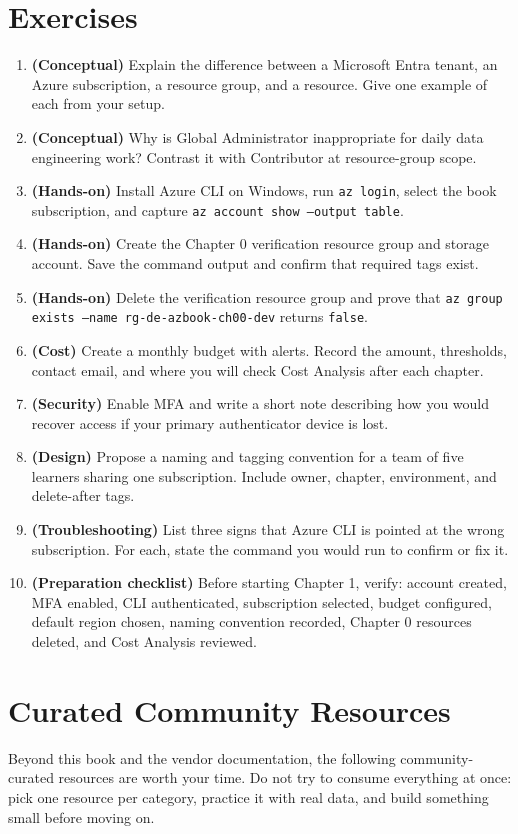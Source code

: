 \section{Exercises}
\begin{enumerate}
    \item \textbf{(Conceptual)} Explain the difference between a Microsoft Entra tenant, an Azure subscription, a resource group, and a resource. Give one example of each from your setup.
    \item \textbf{(Conceptual)} Why is Global Administrator inappropriate for daily data engineering work? Contrast it with Contributor at resource-group scope.
    \item \textbf{(Hands-on)} Install Azure CLI on Windows, run \texttt{az login}, select the book subscription, and capture \texttt{az account show --output table}.
    \item \textbf{(Hands-on)} Create the Chapter 0 verification resource group and storage account. Save the command output and confirm that required tags exist.
    \item \textbf{(Hands-on)} Delete the verification resource group and prove that \texttt{az group exists --name rg-de-azbook-ch00-dev} returns \texttt{false}.
    \item \textbf{(Cost)} Create a monthly budget with alerts. Record the amount, thresholds, contact email, and where you will check Cost Analysis after each chapter.
    \item \textbf{(Security)} Enable MFA and write a short note describing how you would recover access if your primary authenticator device is lost.
    \item \textbf{(Design)} Propose a naming and tagging convention for a team of five learners sharing one subscription. Include owner, chapter, environment, and delete-after tags.
    \item \textbf{(Troubleshooting)} List three signs that Azure CLI is pointed at the wrong subscription. For each, state the command you would run to confirm or fix it.
    \item \textbf{(Preparation checklist)} Before starting Chapter 1, verify: account created, MFA enabled, CLI authenticated, subscription selected, budget configured, default region chosen, naming convention recorded, Chapter 0 resources deleted, and Cost Analysis reviewed.
\end{enumerate}

\section{Curated Community Resources}
%
Beyond this book and the vendor documentation, the following community-curated resources are worth your time. Do not try to consume everything at once: pick one resource per category, practice it with real data, and build something small before moving on.

